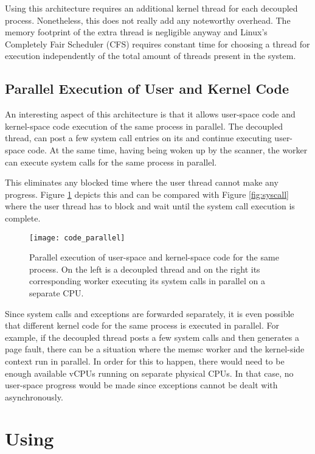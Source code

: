 Using this architecture requires an additional kernel thread for each decoupled
\llinux process. Nonetheless, this does not really add any noteworthy overhead.
The memory footprint of the extra thread is negligible anyway and Linux's
Completely Fair Scheduler (CFS) requires constant time for choosing a thread
for execution independently of the total amount of threads present in the
system.

\subsection{Parallel Execution of User and Kernel Code}

An interesting aspect of this architecture is that it allows user-space code
and kernel-space code execution of the same process in parallel. The decoupled
thread, can post a few system call entries on its \sysp and continue executing
user-space code. At the same time, having being woken up by the scanner, the
\memsc worker can execute system calls for the same process in parallel.

This eliminates any blocked time where the user thread cannot make any
progress. Figure \ref{fig:code_parallel} depicts this and can be compared with
Figure \ref{fig:syscall} where the user thread has to block and wait until the
system call execution is complete.

\begin{figure}[h]
\centering
\texttt{[image: code\_parallel]}
  \caption{Parallel execution of user-space and kernel-space code for the same
  process. On the left is a decoupled \llinux thread and on the right its
  corresponding \memsc worker executing its system calls in parallel on a
  separate CPU.}
\label{fig:code_parallel}
\end{figure}

\break

Since system calls and exceptions are forwarded separately, it is even possible
that different kernel code for the same process is executed in parallel. For
example, if the decoupled thread posts a few system calls and then generates a
page fault, there can be a situation where the memsc worker and the kernel-side
context run in parallel. In order for this to happen, there would need to be
enough available vCPUs running on separate physical CPUs. In that case, no
user-space progress would be made since exceptions cannot be dealt with
asynchronously.

\section{Using \memsc}

